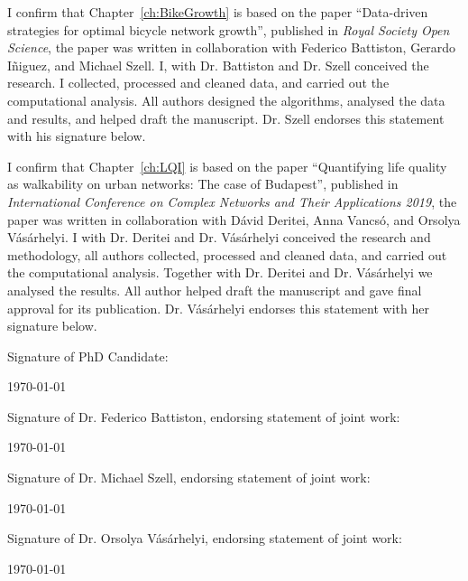 \documentclass[a4paper,twoside,12pt]{book}
\begin{document}
I confirm that Chapter~\ref{ch:BikeGrowth} is based on the paper ``Data-driven strategies for optimal bicycle network growth'', published in \textit{Royal Society Open Science}, the paper was written in collaboration with Federico Battiston, Gerardo I\~niguez, and Michael Szell. I, with Dr. Battiston and Dr. Szell conceived the research. I collected, processed and cleaned data, and carried out the computational analysis. All authors designed the algorithms, analysed the data and results, and helped draft the manuscript. Dr. Szell endorses this statement with his signature below.

\vspace{.2cm}

\noindent
I confirm that Chapter~\ref{ch:LQI} is based on the paper ``Quantifying life quality as walkability on urban networks: The case of Budapest'', published in \textit{International Conference on Complex Networks and Their Applications 2019}, the paper was written in collaboration with D\'avid Deritei, Anna Vancs\'o, and Orsolya V\'as\'arhelyi. I with Dr. Deritei and Dr. V\'as\'arhelyi conceived the research and methodology, all authors collected, processed and cleaned data, and carried out the computational analysis. Together with Dr. Deritei and Dr. V\'as\'arhelyi we analysed the results. All author helped draft the manuscript and gave final approval for its publication. Dr. V\'as\'arhelyi endorses this statement with her signature below.

\vspace{1.5cm}
\noindent
Signature of PhD Candidate:

\vspace{2cm}
\noindent
\monthyeardate\today


\vspace{3.5cm}
\noindent
Signature of Dr. Federico Battiston, endorsing statement of joint work:

\vspace{2cm}
\noindent
\monthyeardate\today


\vspace{3.5cm}
\noindent
Signature of Dr. Michael Szell, endorsing statement of joint work:

\vspace{2cm}
\noindent
\monthyeardate\today

\vspace{3.5cm}
\noindent
Signature of Dr. Orsolya V\'as\'arhelyi, endorsing statement of joint work:

\vspace{2cm}
\noindent
\monthyeardate\today
\end{document}
